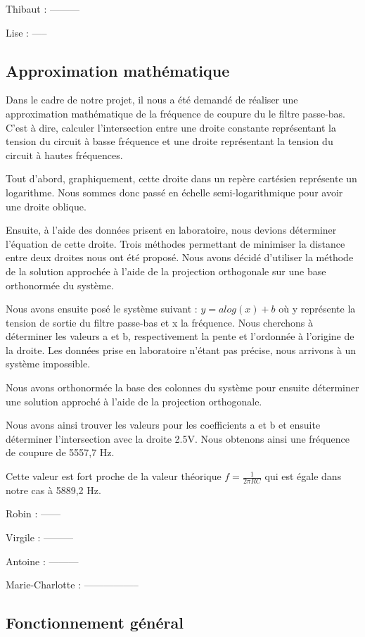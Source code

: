 
Thibaut :
---------


Lise :
-----

\subsection{Approximation mathématique}

Dans le cadre de notre projet, il nous a été demandé de réaliser une approximation mathématique de la fréquence de coupure
du le filtre passe-bas. C'est à dire, calculer l'intersection entre une droite constante représentant la tension du circuit à basse fréquence et une droite représentant la tension du circuit à hautes fréquences. 

Tout d'abord, graphiquement, cette droite dans un repère cartésien représente un logarithme. Nous sommes donc passé en échelle semi-logarithmique pour avoir une droite oblique.

Ensuite, à l'aide des données prisent en laboratoire, nous devions déterminer l'équation de cette droite. Trois méthodes permettant de minimiser la distance entre deux droites nous ont été proposé. Nous avons décidé d'utiliser
la méthode de la solution approchée à l'aide de la projection orthogonale sur une base orthonormée du système. 

Nous avons ensuite posé le système suivant : $y = a log(x) + b$ où y représente la tension de sortie du filtre passe-bas et x la fréquence. Nous cherchons à déterminer les valeurs a et b, 
respectivement la pente et l'ordonnée à l'origine de la droite. Les données prise en laboratoire n'étant pas précise, nous arrivons à un système impossible. 

Nous avons orthonormée la base des colonnes du système pour ensuite  déterminer une solution approché à l'aide de la projection orthogonale. 

Nous avons ainsi trouver les valeurs pour les coefficients a et b et ensuite déterminer l'intersection avec la droite 2.5V.
Nous obtenons ainsi une fréquence de coupure de 5557,7 Hz. 

Cette valeur est fort proche de la valeur théorique $f = \frac{1}{2\pi RC}$ qui est égale dans notre cas à 5889,2 Hz.


Robin :
------


Virgile :
---------


Antoine :
---------


Marie-Charlotte :
-----------------

\subsection{Fonctionnement général}

